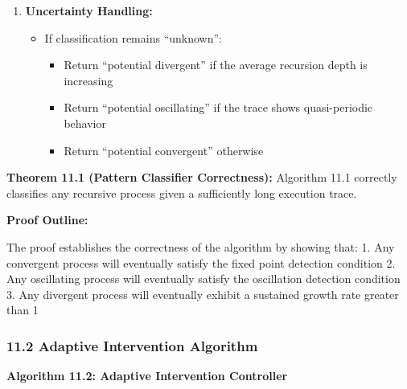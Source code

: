 \documentclass[
]{article}
\providecommand{\tightlist}{%
  \setlength{\itemsep}{0pt}\setlength{\parskip}{0pt}}
\begin{document}
\begin{enumerate}
  \begin{itemize}
  \tightlist
  \item
    Compute growth rate \(g_i = \frac{d(R, s_0, i+1)}{d(R, s_0, i)}\)
    for each \(i\)
  \item
    If \(\frac{1}{n-w} \sum_{i=n-w}^{n-1} g_i > 1 + \epsilon\):

    \begin{itemize}
    \tightlist
    \item
      Classify as ``divergent''
    \end{itemize}
  \end{itemize}
\item
  \textbf{Uncertainty Handling:}

  \begin{itemize}
  \tightlist
  \item
    If classification remains ``unknown'':

    \begin{itemize}
    \tightlist
    \item
      Return ``potential divergent'' if the average recursion depth is
      increasing
    \item
      Return ``potential oscillating'' if the trace shows quasi-periodic
      behavior
    \item
      Return ``potential convergent'' otherwise
    \end{itemize}
  \end{itemize}
\end{enumerate}

\textbf{Theorem 11.1 (Pattern Classifier Correctness):} Algorithm 11.1
correctly classifies any recursive process given a sufficiently long
execution trace.

\textbf{Proof Outline:}

The proof establishes the correctness of the algorithm by showing that:
1. Any convergent process will eventually satisfy the fixed point
detection condition 2. Any oscillating process will eventually satisfy
the oscillation detection condition 3. Any divergent process will
eventually exhibit a sustained growth rate greater than 1

\subsubsection{11.2 Adaptive Intervention
Algorithm}\label{adaptive-intervention-algorithm}

\textbf{Algorithm 11.2: Adaptive Intervention Controller}
\end{document}
